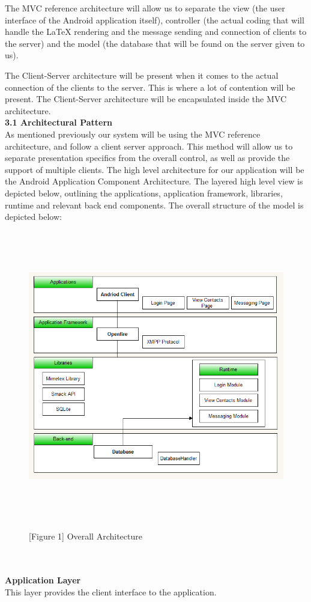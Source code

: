 \documentclass[29pt,a4paper]{moderncv}
\begin{document}
		\parindent 5mm The MVC reference architecture will allow us to separate the view (the user interface of the Android application itself),  controller (the actual coding that will handle the LaTeX rendering and the message sending and connection of clients to the server) and the model (the database that will be found on the server given to us).
		
		\parindent 5mm The Client-Server architecture will be present when it comes to the actual connection of the clients to the server. This is where a lot of contention will be present. The Client-Server architecture will be encapsulated inside the MVC architecture.\\

		\noindent \textbf{3.1 Architectural Pattern}
			\\As mentioned previously our system will be using the MVC reference architecture, and follow a client server approach. This method will allow us to separate presentation specifics from the overall control, as well as provide the support of multiple clients. The high level architecture for our application will be the Android Application Component Architecture.  The layered high level view is depicted below, outlining the applications, application framework, libraries, runtime  and relevant back end components. The overall structure of the model is depicted below:\\
\newpage
				\noindent\begin{figure}
				\centering
				\includegraphics[width=6.0in, height=5.0in]{./overall_arch.png}
				\\\caption{[Figure 1] Overall Architecture}
				\end{figure}\\ 
			\\ \noindent\textbf{Application Layer}\\
			This layer provides the client interface to the application.\\
			
\end{document}
